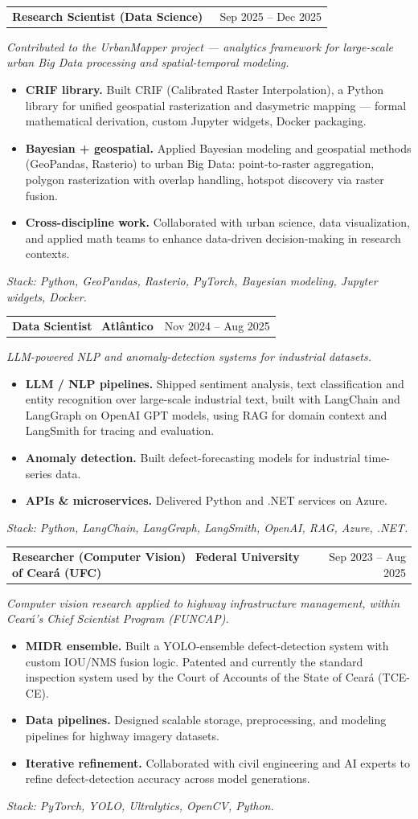\documentclass[10pt,a4paper]{article}
\makeatletter
\newcommand{\job}[3]{%
  \par\vspace{4pt}%
  \noindent\begin{tabularx}{\linewidth}{@{}X r@{}}%
    \textbf{#1} \, {\color{accent}\textbf{#2}} & {\small\color{muted}#3} \\
  \end{tabularx}%
  \vspace{1pt}%
}
\newcommand{\usflag}{%
  \begin{tikzpicture}[baseline=-0.1ex, x=1em, y=1em]
    \foreach \i in {0,...,6} {%
      \fill[flagred] (0,{\i*0.1}) rectangle (1.5,{\i*0.1+0.05});
      \fill[white] (0,{\i*0.1+0.05}) rectangle (1.5,{\i*0.1+0.1});
    }
    \fill[flagblue] (0,0.35) rectangle (0.62,0.7);
    \foreach \x in {0.1,0.26,0.42} \foreach \y in {0.44,0.6}
      \fill[white] (\x+0.05,\y) circle (0.025);
    \draw[rule, line width=0.2pt] (0,0) rectangle (1.5,0.7);
  \end{tikzpicture}%
}
\makeatother
\begin{document}
\job{Research Scientist (Data Science)}{Vida Center --- NYU, New York \usflag}{Sep 2025 -- Dec 2025}
\textit{\small Contributed to the UrbanMapper project --- analytics framework for large-scale urban Big Data processing and spatial-temporal modeling.}
\begin{itemize}
  \item \textbf{CRIF library.} Built CRIF (Calibrated Raster Interpolation), a Python library for unified geospatial rasterization and dasymetric mapping --- formal mathematical derivation, custom Jupyter widgets, Docker packaging.
  \item \textbf{Bayesian + geospatial.} Applied Bayesian modeling and geospatial methods (GeoPandas, Rasterio) to urban Big Data: point-to-raster aggregation, polygon rasterization with overlap handling, hotspot discovery via raster fusion.
  \item \textbf{Cross-discipline work.} Collaborated with urban science, data visualization, and applied math teams to enhance data-driven decision-making in research contexts.
\end{itemize}
\textit{\small Stack: Python, GeoPandas, Rasterio, PyTorch, Bayesian modeling, Jupyter widgets, Docker.}

\job{Data Scientist}{Atl\^antico}{Nov 2024 -- Aug 2025}
\textit{\small LLM-powered NLP and anomaly-detection systems for industrial datasets.}
\begin{itemize}
  \item \textbf{LLM / NLP pipelines.} Shipped sentiment analysis, text classification and entity recognition over large-scale industrial text, built with LangChain and LangGraph on OpenAI GPT models, using RAG for domain context and LangSmith for tracing and evaluation.
  \item \textbf{Anomaly detection.} Built defect-forecasting models for industrial time-series data.
  \item \textbf{APIs \& microservices.} Delivered Python and .NET services on Azure.
\end{itemize}
\textit{\small Stack: Python, LangChain, LangGraph, LangSmith, OpenAI, RAG, Azure, .NET.}

\job{Researcher (Computer Vision)}{Federal University of Cear\'a (UFC)}{Sep 2023 -- Aug 2025}
\textit{\small Computer vision research applied to highway infrastructure management, within Cear\'a's Chief Scientist Program (FUNCAP).}
\begin{itemize}
  \item \textbf{MIDR ensemble.} Built a YOLO-ensemble defect-detection system with custom IOU/NMS fusion logic. Patented and currently the standard inspection system used by the Court of Accounts of the State of Cear\'a (TCE-CE).
  \item \textbf{Data pipelines.} Designed scalable storage, preprocessing, and modeling pipelines for highway imagery datasets.
  \item \textbf{Iterative refinement.} Collaborated with civil engineering and AI experts to refine defect-detection accuracy across model generations.
\end{itemize}
\textit{\small Stack: PyTorch, YOLO, Ultralytics, OpenCV, Python.}
\end{document}
